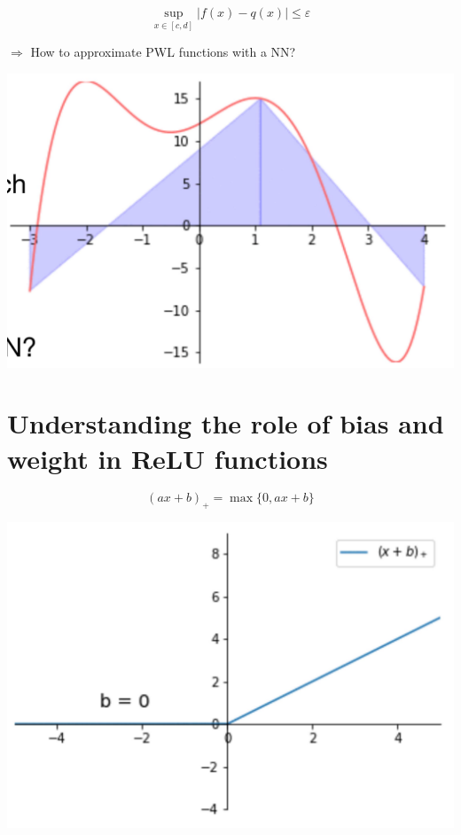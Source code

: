 \documentclass[10pt]{article}
\begin{document}
$$
\sup _{x \in[c, d]}|f(x)-q(x)| \leq \varepsilon
$$

$\Rightarrow$ How to approximate PWL functions with a NN?

\begin{center}
\includegraphics[max width=\textwidth]{2024_01_08_0e0dcffe4bc8c6049046g-32}
\end{center}

\section*{Understanding the role of bias and weight in ReLU functions}
$$
(a x+b)_{+}=\max \{0, a x+b\}
$$

\begin{center}
\includegraphics[max width=\textwidth]{2024_01_08_0e0dcffe4bc8c6049046g-33(1)}
\end{center}
\end{document}
